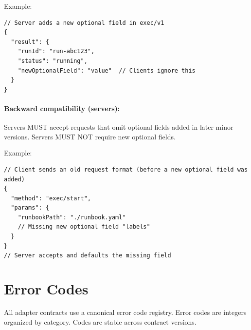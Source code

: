 Example:

\begin{verbatim}
// Server adds a new optional field in exec/v1
{
  "result": {
    "runId": "run-abc123",
    "status": "running",
    "newOptionalField": "value"  // Clients ignore this
  }
}
\end{verbatim}

\paragraph{Backward compatibility (servers):}

Servers MUST accept requests that omit optional fields added in later minor
versions.  Servers MUST NOT require new optional fields.

Example:

\begin{verbatim}
// Client sends an old request format (before a new optional field was added)
{
  "method": "exec/start",
  "params": {
    "runbookPath": "./runbook.yaml"
    // Missing new optional field "labels"
  }
}
// Server accepts and defaults the missing field
\end{verbatim}

\section{Error Codes}
\label{sec:error-codes}

All adapter contracts use a canonical error code registry.  Error codes are
integers organized by category.  Codes are stable across contract versions.

